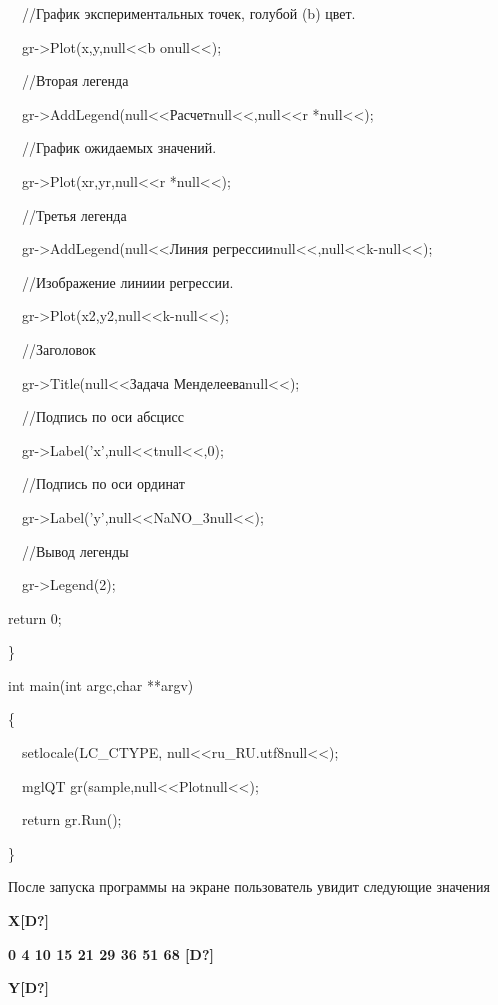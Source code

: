 {\upshape
\ \ //График экспериментальных точек, голубой (b) цвет.}

{\upshape
\ \ gr-{\textgreater}Plot(x,y,null{<<}b onull{<<});}

{\upshape
\ \ //Вторая легенда}

{\upshape
\ \ gr-{\textgreater}AddLegend(null{<<}Расчетnull{<<},null{<<}r *null{<<});}

{\upshape
\ \ //График ожидаемых значений.}

{\upshape
\ \ gr-{\textgreater}Plot(xr,yr,null{<<}r *null{<<});}

{\upshape
\ \ //Третья легенда}

{\upshape
\ \ gr-{\textgreater}AddLegend(null{<<}Линия регрессииnull{<<},null{<<}k-null{<<});}

{\upshape
\ \ //Изображение линиии регрессии.}

{\upshape
\ \ gr-{\textgreater}Plot(x2,y2,null{<<}k-null{<<});}

{\upshape
\ \ //Заголовок}

{\upshape
\ \ gr-{\textgreater}Title(null{<<}Задача Менделееваnull{<<});}

{\upshape
\ \ //Подпись по оси абсцисс}

{\upshape
\ \ gr-{\textgreater}Label('x',null{<<}tnull{<<},0);}

{\upshape
\ \ //Подпись по оси ординат}

{\upshape
\ \ gr-{\textgreater}Label('y',null{<<}NaNO\_3null{<<});}

{\upshape
\ \ //Вывод легенды}

{\upshape
\ \ gr-{\textgreater}Legend(2);}

{\upshape
return 0;}

{\upshape
\}}

{\upshape
int main(int argc,char **argv)}

{\upshape
\{}

{\upshape
\ \ setlocale(LC\_CTYPE, null{<<}ru\_RU.utf8null{<<});}

{\upshape
\ \ mglQT gr(sample,null{<<}Plotnull{<<});}

{\upshape
\ \ return gr.Run();}

{\upshape
\}}

После запуска программы на экране пользователь увидит следующие значения

{\bfseries
X\textlatin{[D?]}}

{\bfseries
0 4 10 15 21 29 36 51 68 \textlatin{[D?]}}

{\bfseries
Y\textlatin{[D?]}}

